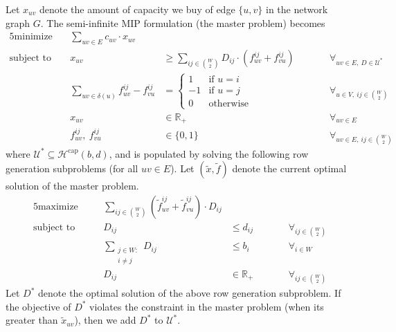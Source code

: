 Let $x_{uv}$ denote the amount of capacity we buy of edge $\{u,v\}$ in the network graph $G$.
The semi-infinite MIP formulation (the master problem) becomes
\begin{alignat*}{5}
    \text{minimize}\ && \sum_{uv \in E} c_{uv} \cdot x_{uv} &&& \\
    \text{subject to}\ && x_{uv} &\ge \sum_{ij \in \binom{W}{2}} D_{ij} \cdot (f_{uv}^{ij} + f_{vu}^{ij}) &&\qquad \forall_{uv \in E,\ D \in \mathcal U^*} \\
    && \sum_{uv \in \delta(u)} f_{uv}^{ij} - f_{vu}^{ij} &= \begin{cases}
                                                                1 & \text{if $u = i$} \\
                                                                -1 & \text{if $u = j$} \\
                                                                0 & \text{otherwise}
    \end{cases} &&\qquad \forall_{u \in V,\ ij \in \binom{W}{2}} \\
    && x_{uv} &\in \mathbb{R}_+ &&\qquad \forall_{uv \in E} \\
    && f_{uv}^{ij},\ f_{vu}^{ij} &\in \{ 0, 1 \} &&\qquad \forall_{uv \in E,\ ij \in \binom{W}{2}}
\end{alignat*}
where $\mathcal U^* \subseteq \mathcal H^\text{cap}(b, d)$, and is populated by solving the following row generation subproblems (for all $uv \in E$).
Let $(\tilde x, \tilde f)$ denote the current optimal solution of the master problem.
\begin{alignat*}{5}
    \text{maximize}\quad && \sum_{ij \in \binom{W}{2}} (\tilde f_{uv}^{ij} + \tilde f_{vu}^{ij}) \cdot D_{ij} &&& \\
    \text{subject to}\quad && D_{ij} &\le d_{ij} &&\qquad \forall_{ij \in \binom W 2} \\
    && \sum_{\substack{j \in W:\\i \neq j}} D_{ij} &\le b_i &&\qquad \forall_{i \in W} \\
    && D_{ij} &\in \mathbb{R}_+ &&\qquad \forall_{ij \in \binom{W}{2}}
\end{alignat*}
Let $D^*$ denote the optimal solution of the above row generation subproblem.
If the objective of $D^*$ violates the constraint in the master problem (when its greater than $\tilde x_{uv}$), then we add $D^*$ to $\mathcal U^*$.

